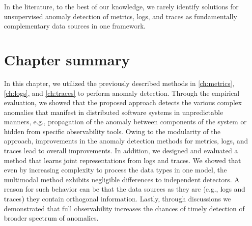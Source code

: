 In the literature, to the best of our knowledge, we rarely identify solutions for unsupervised anomaly detection of metrics, logs, and traces as fundamentally complementary data sources in one framework. 


\section{Chapter summary}
In this chapter, we utilized the previously described methods in \autoref{ch:metrics}, \autoref{ch:logs}, and \autoref{ch:traces} to perform anomaly detection. Through the empirical evaluation, we showed that the proposed approach detects the various complex anomalies that manifest in distributed software systems in unpredictable manners, e.g., propagation of the anomaly between components of the system or hidden from specific observability tools. Owing to the modularity of the approach, improvements in the anomaly detection methods for metrics, logs, and traces lead to overall improvements. In addition, we designed and evaluated a method that learns joint representations from logs and traces. We showed that even by increasing complexity to process the data types in one model, the multimodal method exhibits negligible differences to independent detectors. A reason for such behavior can be that the data sources as they are (e.g., logs and traces) they contain orthogonal information. Lastly, through discussions we demonstrated that full observability increases the chances of timely detection of broader spectrum of anomalies.


